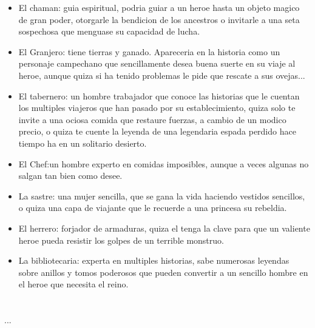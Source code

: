 \begin{itemize}
	\item El chaman: guia espiritual, podria guiar a un heroe hasta un objeto magico de gran poder, otorgarle la bendicion de los ancestros o invitarle a una seta sospechosa que menguase su capacidad de lucha.
	\item El Granjero: tiene tierras y ganado. Apareceria en la historia como un personaje campechano que sencillamente desea buena suerte en su viaje al heroe, aunque quiza si ha tenido problemas le pide que rescate a sus ovejas...
	\item El tabernero: un hombre trabajador que conoce las historias que le cuentan los multiples viajeros que han pasado por su establecimiento, quiza solo te invite a una ociosa comida que restaure fuerzas, a cambio de un modico precio, o quiza te cuente la leyenda de una legendaria espada perdido hace tiempo ha en un solitario desierto.
	\item El Chef:un hombre experto en comidas imposibles, aunque a veces algunas no salgan tan bien como desee.
	\item La sastre: una mujer sencilla, que se gana la vida haciendo vestidos sencillos, o quiza una capa de viajante que le recuerde a una princesa su rebeldia.
	\item El herrero: forjador de armaduras, quiza el tenga la clave para que un valiente heroe pueda resistir los golpes de un terrible monstruo.
	\item La bibliotecaria: experta en multiples historias, sabe numerosas leyendas sobre anillos y tomos poderosos que pueden convertir a un sencillo hombre en el heroe que necesita el reino.
\end{itemize}

\section*{\ProximoCapitulo}
\TocProximoCapitulo

...





